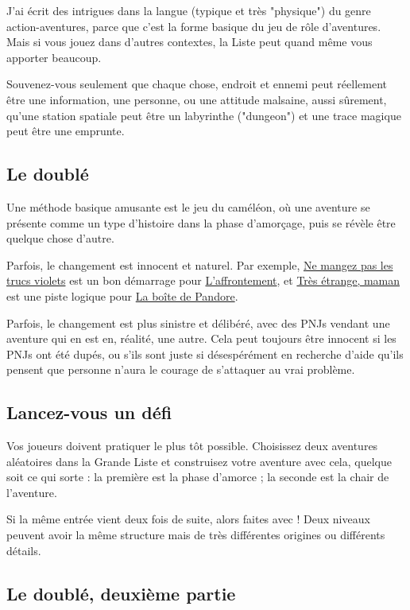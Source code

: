 \begin{multicols}{2}
J'ai écrit des intrigues dans la langue (typique et très "physique") du genre action-aventures, parce que c'est la forme basique du jeu de rôle d'aventures. Mais si vous jouez dans d'autres contextes, la Liste peut quand même vous apporter beaucoup.

Souvenez-vous seulement que chaque chose, endroit et ennemi peut réellement être une information, une personne, ou une attitude malsaine, aussi sûrement, qu'une station spatiale peut être un labyrinthe ("dungeon") et une trace magique peut être une emprunte.

\subsection*{Le doublé}
\label{double1}

Une méthode basique amusante est le jeu du caméléon, où une aventure se présente comme un type d'histoire dans la phase d'amorçage, puis se révèle être quelque chose d'autre.

Parfois, le changement est innocent et naturel. Par exemple, \hyperref[violet]{Ne mangez pas les trucs violets} est un bon démarrage pour \hyperref[affrontement]{L'affrontement}, et \hyperref[etrange]{Très étrange, maman} est une piste logique pour \hyperref[pandore]{La boîte de Pandore}.

Parfois, le changement est plus sinistre et délibéré, avec des PNJs vendant une aventure qui en est en, réalité, une autre. Cela peut toujours être innocent si les PNJs ont été dupés, ou s'ils sont juste si désespérément en recherche d'aide qu'ils pensent que personne n'aura le courage de s'attaquer au vrai problème.

\subsection*{Lancez-vous un défi}
\label{defi}

Vos joueurs doivent pratiquer le plus tôt possible. Choisissez deux aventures aléatoires dans la Grande Liste et construisez votre aventure avec cela, quelque soit ce qui sorte : la première est la phase d'amorce ; la seconde est la chair de l'aventure.

Si la même entrée vient deux fois de suite, alors faites avec ! Deux niveaux peuvent avoir la même structure mais de très différentes origines ou différents détails.

\subsection*{Le doublé, deuxième partie}
\label{double2}


\end{multicols}
